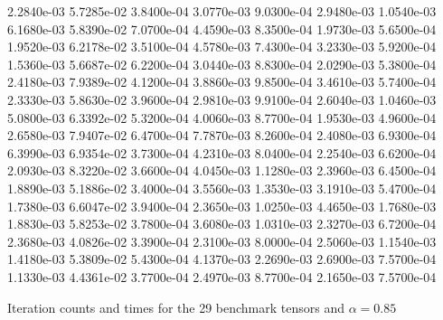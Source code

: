 \documentclass[10pt]{paper}
\begin{document}
\begin{table}
{   2.2840e-03   5.7285e-02   3.8400e-04   3.0770e-03   9.0300e-04   2.9480e-03   1.0540e-03
   6.1680e-03   5.8390e-02   7.0700e-04   4.4590e-03   8.3500e-04   1.9730e-03   5.6500e-04
   1.9520e-03   6.2178e-02   3.5100e-04   4.5780e-03   7.4300e-04   3.2330e-03   5.9200e-04
   1.5360e-03   5.6687e-02   6.2200e-04   3.0440e-03   8.8300e-04   2.0290e-03   5.3800e-04
   2.4180e-03   7.9389e-02   4.1200e-04   3.8860e-03   9.8500e-04   3.4610e-03   5.7400e-04
   2.3330e-03   5.8630e-02   3.9600e-04   2.9810e-03   9.9100e-04   2.6040e-03   1.0460e-03
   5.0800e-03   6.3392e-02   5.3200e-04   4.0060e-03   8.7700e-04   1.9530e-03   4.9600e-04
   2.6580e-03   7.9407e-02   6.4700e-04   7.7870e-03   8.2600e-04   2.4080e-03   6.9300e-04
   6.3990e-03   6.9354e-02   3.7300e-04   4.2310e-03   8.0400e-04   2.2540e-03   6.6200e-04
   2.0930e-03   8.3220e-02   3.6600e-04   4.0450e-03   1.1280e-03   2.3960e-03   6.4500e-04
   1.8890e-03   5.1886e-02   3.4000e-04   3.5560e-03   1.3530e-03   3.1910e-03   5.4700e-04
   1.7380e-03   6.6047e-02   3.9400e-04   2.3650e-03   1.0250e-03   4.4650e-03   1.7680e-03
   1.8830e-03   5.8253e-02   3.7800e-04   3.6080e-03   1.0310e-03   2.3270e-03   6.7200e-04
   2.3680e-03   4.0826e-02   3.3900e-04   2.3100e-03   8.0000e-04   2.5060e-03   1.1540e-03
   1.4180e-03   5.3809e-02   5.4300e-04   4.1370e-03   2.2690e-03   2.6900e-03   7.5700e-04
   1.1330e-03   4.4361e-02   3.7700e-04   2.4970e-03   8.7700e-04   2.1650e-03   7.5700e-04
   }	
	\caption{Iteration counts and times for the 29 benchmark tensors and $\alpha = 0.85$}
\end{table}
\end{document}
